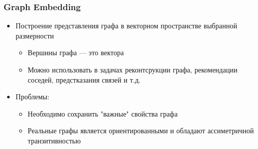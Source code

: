 \documentclass[xcolor=table,english]{beamer}
\begin{document}
\begin{frame}[fragile] \frametitle{Graph Embedding}
    \begin{itemize}
        \item Построение представления графа в векторном пространстве выбранной размерности
        {
            \begin{itemize}
                \item Вершины графа --- это вектора
                \item Можно использовать в задачах реконтсрукции графа, рекомендации соседей, предстказания связей и т.д.
            \end{itemize} 
        }
        \item Проблемы:
        {
            \begin{itemize}
                \item Необходимо сохранить "важные" свойства графа
                \item Реальные графы является ориентированными и обладают ассиметричной транзитивностью
            \end{itemize}
        }
    \end{itemize}
\end{frame}
\end{document}
